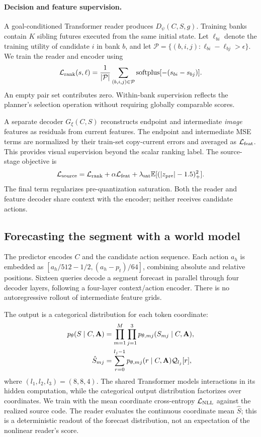 \paragraph{Decision and feature supervision.}
A goal-conditioned Transformer reader produces $D_\psi(C,S,g)$. Training banks contain $K$ sibling futures executed from the same initial state. Let $\ell_{bi}$ denote the training utility of candidate $i$ in bank $b$, and let $\mathcal P=\{(b,i,j):\ell_{bi}-\ell_{bj}>\epsilon\}$. We train the reader and encoder using
\begin{equation}
\mathcal L_{\rm rank}(s,\ell)=\frac{1}{|\mathcal P|}
\sum_{(b,i,j)\in\mathcal P}\operatorname{softplus}[-(s_{bi}-s_{bj})].
\label{eq:rank}
\end{equation}
An empty pair set contributes zero. Within-bank supervision reflects the planner's selection operation without requiring globally comparable scores.

A separate decoder $G_\xi(C,S)$ reconstructs endpoint and intermediate \emph{image} features as residuals from current features. The endpoint and intermediate MSE terms are normalized by their train-set copy-current errors and averaged as $\mathcal L_{\rm feat}$. This provides visual supervision beyond the scalar ranking label. The source-stage objective is
\begin{equation}
\mathcal L_{\rm source}=\mathcal L_{\rm rank}
+\alpha\mathcal L_{\rm feat}
+\lambda_{\rm sat}\mathbb{E}[(|z_{\rm pre}|-1.5)_+^2].
\label{eq:source}
\end{equation}
The final term regularizes pre-quantization saturation. Both the reader and feature decoder share context with the encoder; neither receives candidate actions.

\subsection{Forecasting the segment with a world model}
\label{sec:wm}
The predictor encodes $C$ and the candidate action sequence. Each action $a_h$ is embedded as $[a_h/512-1/2,(a_h-p_t)/64]$, combining absolute and relative positions. Sixteen queries decode a segment forecast in parallel through four decoder layers, following a four-layer context/action encoder. There is no autoregressive rollout of intermediate feature grids.

The output is a categorical distribution for each token coordinate:
\begin{align}
p_\theta(S\mid C,\mathbf{A})&=\prod_{m=1}^{M}\prod_{j=1}^{3}p_{\theta,mj}(S_{mj}\mid C,\mathbf{A}),\\
\hat S_{mj}&=\sum_{r=0}^{l_j-1}p_{\theta,mj}(r\mid C,\mathbf{A})\mathcal Q_{l_j}[r],
\label{eq:mean}
\end{align}
where $(l_1,l_2,l_3)=(8,8,4)$. The shared Transformer models interactions in its hidden computation, while the categorical output distribution factorizes over coordinates. We train with the mean coordinate cross-entropy $\mathcal L_{\rm NLL}$ against the realized source code. The reader evaluates the continuous coordinate mean $\hat S$; this is a deterministic readout of the forecast distribution, not an expectation of the nonlinear reader's score.

